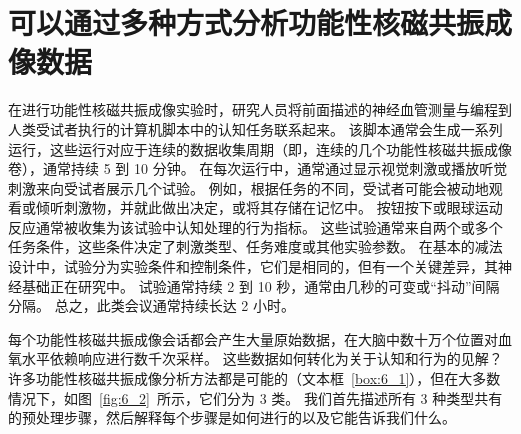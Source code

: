 \section{可以通过多种方式分析功能性核磁共振成像数据}

在进行功能性核磁共振成像实验时，研究人员将前面描述的神经血管测量与编程到人类受试者执行的计算机脚本中的认知任务联系起来。
该脚本通常会生成一系列运行，这些运行对应于连续的数据收集周期（即，连续的几个功能性核磁共振成像卷），通常持续 5 到 10 分钟。 
在每次运行中，通常通过显示视觉刺激或播放听觉刺激来向受试者展示几个试验。 
例如，根据任务的不同，受试者可能会被动地观看或倾听刺激物，并就此做出决定，或将其存储在记忆中。 
按钮按下或眼球运动反应通常被收集为该试验中认知处理的行为指标。 
这些试验通常来自两个或多个任务条件，这些条件决定了刺激类型、任务难度或其他实验参数。 
在基本的减法设计中，试验分为实验条件和控制条件，它们是相同的，但有一个关键差异，其神经基础正在研究中。 
试验通常持续 2 到 10 秒，通常由几秒的可变或“抖动”间隔分隔。 
总之，此类会议通常持续长达 2 小时。


每个功能性核磁共振成像会话都会产生大量原始数据，在大脑中数十万个位置对血氧水平依赖响应进行数千次采样。 
这些数据如何转化为关于认知和行为的见解？ 
许多功能性核磁共振成像分析方法都是可能的（文本框~\ref{box:6_1}），但在大多数情况下，如图~\ref{fig:6_2}~所示，它们分为 3 类。
我们首先描述所有 3 种类型共有的预处理步骤，然后解释每个步骤是如何进行的以及它能告诉我们什么。


